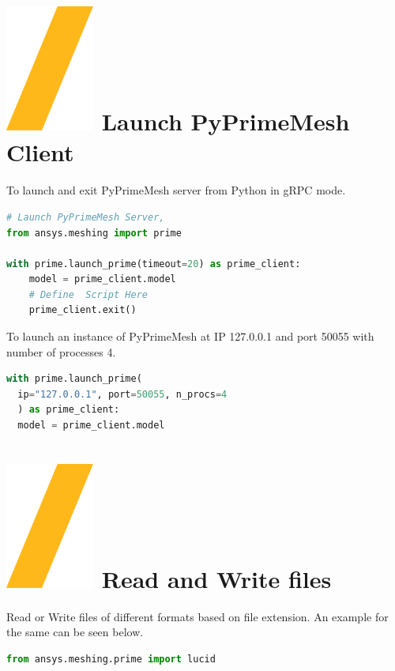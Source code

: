 \documentclass[9pt,landscape]{article}
\begin{document}
\begin{multicols}{3}
\setlength{\premulticols}{1pt}
\setlength{\postmulticols}{1pt}
\setlength{\multicolsep}{1pt}
\setlength{\columnsep}{2pt}

\vfill
\section{\includegraphics[height=\fontcharht\font`\S]{slash.png} Launch PyPrimeMesh Client}
To launch and exit PyPrimeMesh server from Python in gRPC mode.\\
\begin{lstlisting}[language=Python]
# Launch PyPrimeMesh Server, 
from ansys.meshing import prime

with prime.launch_prime(timeout=20) as prime_client:
    model = prime_client.model
    # Define  Script Here
    prime_client.exit()
\end{lstlisting}

To launch an instance of PyPrimeMesh at IP
127.0.0.1 and port 50055 with number of processes 4.
\begin{lstlisting}[language=Python]
with prime.launch_prime(
  ip="127.0.0.1", port=50055, n_procs=4
  ) as prime_client:
  model = prime_client.model
\end{lstlisting}

\section{\includegraphics[height=\fontcharht\font`\S]{slash.png} Read and Write files }
Read or Write files of different formats based on file extension.
An example for the same can be seen below.\\
\begin{lstlisting}[language=Python]
from ansys.meshing.prime import lucid


\end{lstlisting}
\end{multicols}
\end{document}
